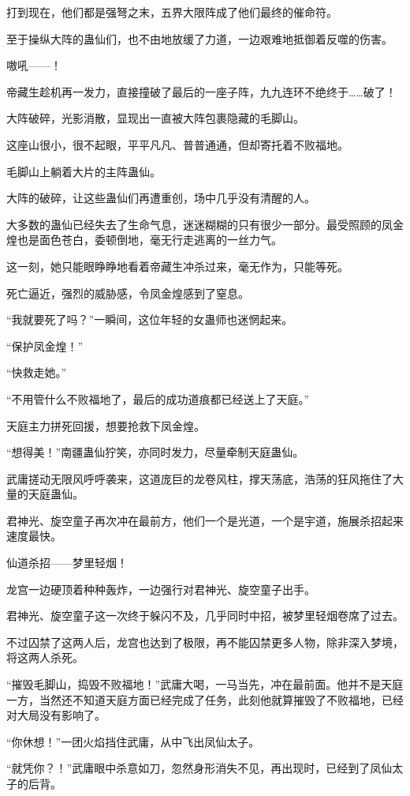 \begin{this_body}
打到现在，他们都是强弩之末，五界大限阵成了他们最终的催命符。

至于操纵大阵的蛊仙们，也不由地放缓了力道，一边艰难地抵御着反噬的伤害。

嗷吼——！

帝藏生趁机再一发力，直接撞破了最后的一座子阵，九九连环不绝终于……破了！

大阵破碎，光影消散，显现出一直被大阵包裹隐藏的毛脚山。

这座山很小，很不起眼，平平凡凡、普普通通，但却寄托着不败福地。

毛脚山上躺着大片的主阵蛊仙。

大阵的破碎，让这些蛊仙们再遭重创，场中几乎没有清醒的人。

大多数的蛊仙已经失去了生命气息，迷迷糊糊的只有很少一部分。最受照顾的凤金煌也是面色苍白，委顿倒地，毫无行走逃离的一丝力气。

这一刻，她只能眼睁睁地看着帝藏生冲杀过来，毫无作为，只能等死。

死亡逼近，强烈的威胁感，令凤金煌感到了窒息。

“我就要死了吗？”一瞬间，这位年轻的女蛊师也迷惘起来。

“保护凤金煌！”

“快救走她。”

“不用管什么不败福地了，最后的成功道痕都已经送上了天庭。”

天庭主力拼死回援，想要抢救下凤金煌。

“想得美！”南疆蛊仙狞笑，亦同时发力，尽量牵制天庭蛊仙。

武庸搓动无限风呼呼袭来，这道庞巨的龙卷风柱，撑天荡底，浩荡的狂风拖住了大量的天庭蛊仙。

君神光、旋空童子再次冲在最前方，他们一个是光道，一个是宇道，施展杀招起来速度最快。

仙道杀招——梦里轻烟！

龙宫一边硬顶着种种轰炸，一边强行对君神光、旋空童子出手。

君神光、旋空童子这一次终于躲闪不及，几乎同时中招，被梦里轻烟卷席了过去。

不过囚禁了这两人后，龙宫也达到了极限，再不能囚禁更多人物，除非深入梦境，将这两人杀死。

“摧毁毛脚山，捣毁不败福地！”武庸大喝，一马当先，冲在最前面。他并不是天庭一方，当然还不知道天庭方面已经完成了任务，此刻他就算摧毁了不败福地，已经对大局没有影响了。

“你休想！”一团火焰挡住武庸，从中飞出凤仙太子。

“就凭你？！”武庸眼中杀意如刀，忽然身形消失不见，再出现时，已经到了凤仙太子的后背。


\end{this_body}
